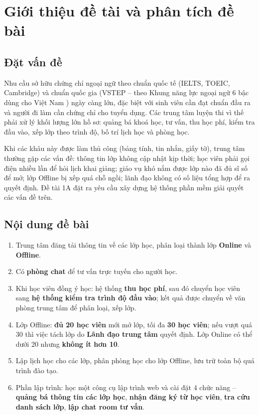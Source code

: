\chapter{Giới thiệu đề tài và phân tích đề bài}
\label{ch:intro}

\section{Đặt vấn đề}
Nhu cầu sở hữu chứng chỉ ngoại ngữ theo chuẩn quốc tế (IELTS, TOEIC, Cambridge) và chuẩn quốc gia (VSTEP – theo Khung năng lực ngoại ngữ 6 bậc dùng cho Việt Nam \cite{tt01}) ngày càng lớn, đặc biệt với sinh viên cần đạt chuẩn đầu ra và người đi làm cần chứng chỉ cho tuyển dụng. Các trung tâm luyện thi vì thế phải xử lý khối lượng lớn hồ sơ: quảng bá khoá học, tư vấn, thu học phí, kiểm tra đầu vào, xếp lớp theo trình độ, bố trí lịch học và phòng học.

Khi các khâu này được làm thủ công (bảng tính, tin nhắn, giấy tờ), trung tâm thường gặp các vấn đề: thông tin lớp không cập nhật kịp thời; học viên phải gọi điện nhiều lần để hỏi lịch khai giảng; giáo vụ khó nắm được lớp nào đã đủ sĩ số để mở; lớp Offline bị xếp quá chỗ ngồi; lãnh đạo không có số liệu tổng hợp để ra quyết định. Đề tài 1A đặt ra yêu cầu xây dựng hệ thống phần mềm giải quyết các vấn đề trên.

\section{Nội dung đề bài}
\begin{notebox}
\begin{enumerate}[leftmargin=1.6em]
  \item Trung tâm đăng tải thông tin về các lớp học, phân loại thành lớp \textbf{Online} và \textbf{Offline}.
  \item Có \textbf{phòng chat} để tư vấn trực tuyến cho người học.
  \item Khi học viên đồng ý học: hệ thống \textbf{thu học phí}, sau đó chuyển học viên sang \textbf{hệ thống kiểm tra trình độ đầu vào}; kết quả được chuyển về văn phòng trung tâm để phân loại, xếp lớp.
  \item Lớp Offline: \textbf{đủ 20 học viên} mới mở lớp, tối đa \textbf{30 học viên}; nếu vượt quá 30 thì việc tách lớp do \textbf{Lãnh đạo trung tâm} quyết định. Lớp Online có thể dưới 20 nhưng \textbf{không ít hơn 10}.
  \item Lập lịch học cho các lớp, phân phòng học cho lớp Offline, lưu trữ toàn bộ quá trình đào tạo.
  \item Phần lập trình: học một công cụ lập trình web và cài đặt 4 chức năng – \textbf{quảng bá thông tin các lớp học}, \textbf{nhận đăng ký từ học viên}, \textbf{tra cứu danh sách lớp}, \textbf{lập chat room tư vấn}.
\end{enumerate}
\end{notebox}

